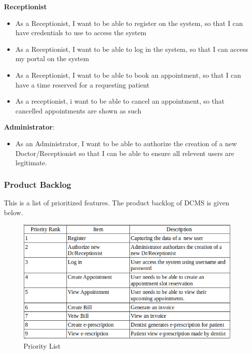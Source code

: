 \documentclass[11 pt]{article}
\begin{document}
\textbf{Receptionist}
   
    \begin{itemize}
  \item
  As a Receptionist, I want to be able to register on the system, so that I can have credentials to use to access the system
  \item
  As a Receptionist, I want to be able to log in the system, so that I can access my portal on the system
  \item
  As a Receptionist, I want to be able to book an appointment, so that I can 				have a time reserved for a requesting patient
  \item
   As a receptionist,  i want to be able to cancel an appointment, so that cancelled appointments are shown as such
   \end{itemize}
   \textbf{Administrator}:
   \begin{itemize}
   \item
   As an Administrator, I want to be able to authorize the creation of a new Doctor/Receptionist so that I can be able to ensure all relevent users are legitimate.
   \end{itemize}
  \subsubsection{Product Backlog}
  This is a list of prioritized features. The product backlog of DCMS is given below.
  
  \begin{figure}[h]
    \centering
    
    \includegraphics[width=\linewidth]{PriorityList.png}
    \caption{Priority List}
    \label{fig:ERD}
    \end{figure}
    
\end{document}
